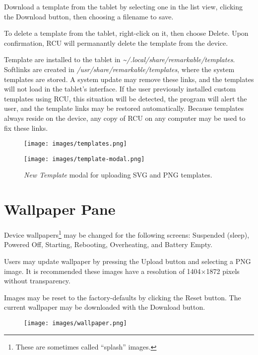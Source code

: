 Download a template from the tablet by selecting one in the list view, clicking the Download button, then choosing a filename to save.

To delete a template from the tablet, right-click on it, then choose Delete. Upon confirmation, RCU will permanantly delete the template from the device.

Template are installed to the tablet in \textit{\textasciitilde/.local/share/remarkable/templates}. Softlinks are created in \textit{/usr/share/remarkable/templates}, where the system templates are stored. A system update may remove these links, and the templates will not load in the tablet's interface. If the user previously installed custom templates using RCU, this situation will be detected, the program will alert the user, and the template links may be restored automatically. Because templates always reside on the device, any copy of RCU on any computer may be used to fix these links.

\vfill
\begin{figure}[h]
  \centering
  \texttt{[image: images/templates.png]}
  \caption{}
  \label{fig:templatespane}
\end{figure}
\vfill


\newpage
\mbox{}
\vfill
\begin{figure}[h]
  \centering
  \texttt{[image: images/template-modal.png]}
  \caption{\textit{New Template} modal for uploading SVG and PNG templates.}
  \label{fig:templatesmodal}
\end{figure}
\vfill


\newpage
\section{Wallpaper Pane}
\label{sec:wallpaperpane}
Device wallpapers\footnote{These are sometimes called ``splash'' images.} may be changed for the following screens: Suspended (sleep), Powered Off, Starting, Rebooting, Overheating, and Battery Empty.

Users may update wallpaper by pressing the Upload button and selecting a PNG image. It is recommended these images have a resolution of 1404$\times$1872 pixels without transparency.

Images may be reset to the factory-defaults by clicking the Reset button. The current wallpaper may be downloaded with the Download button.

\vfill
\begin{figure}[h]
  \centering
  \texttt{[image: images/wallpaper.png]}
  \caption{}
  \label{fig:wallpaperpane}
\end{figure}
\vfill


